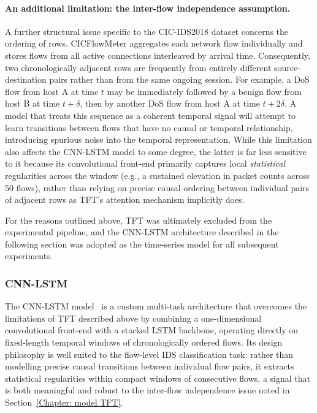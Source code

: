 \documentclass[../main.tex]{subfiles}
\begin{document}
\paragraph{An additional limitation: the inter-flow independence assumption.}
A further structural issue specific to the CIC-IDS2018 dataset concerns the ordering of rows.  CICFlowMeter aggregates each network flow individually and stores flows from all active connections interleaved by arrival time.  Consequently, two chronologically adjacent rows are frequently from entirely different source-destination pairs rather than from the same ongoing session.  For example, a DoS flow from host A at time $t$ may be immediately followed by a benign flow from host B at time $t{+}\delta$, then by another DoS flow from host A at time $t{+}2\delta$.  A model that treats this sequence as a coherent temporal signal will attempt to learn transitions between flows that have no causal or temporal relationship, introducing spurious noise into the temporal representation.  While this limitation also affects the CNN-LSTM model to some degree, the latter is far less sensitive to it because its convolutional front-end primarily captures local \emph{statistical} regularities across the window (e.g., a sustained elevation in packet counts across 50 flows), rather than relying on precise causal ordering between individual pairs of adjacent rows as TFT's attention mechanism implicitly does.

For the reasons outlined above, TFT was ultimately excluded from the experimental pipeline, and the CNN-LSTM architecture described in the following section was adopted as the time-series model for all subsequent experiments.

\newpage
\subsubsection{CNN-LSTM}
\label{Chapter: model cnn-lstm}

The CNN-LSTM model~\supercite{jablaoui2024effective} is a custom multi-task architecture that overcomes the limitations of TFT described above by combining a one-dimensional convolutional front-end with a stacked LSTM backbone, operating directly on fixed-length temporal windows of chronologically ordered flows.  Its design philosophy is well suited to the flow-level IDS classification task: rather than modelling precise causal transitions between individual flow pairs, it extracts statistical regularities within compact windows of consecutive flows, a signal that is both meaningful and robust to the inter-flow independence issue noted in Section~\ref{Chapter: model TFT}.
\end{document}
